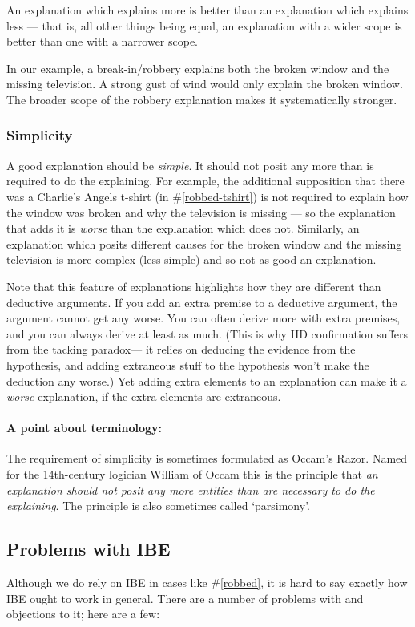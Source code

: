 \documentclass[]{article}
\newcommand*{\terminology}{\paragraph{A point about terminology:}}
\begin{document}
An explanation which explains more is better than an explanation which explains less --- that is, all other things being equal, an explanation with a wider scope is better than one with a narrower scope.

In our example, a break-in/robbery explains both the broken window and the missing television. A strong gust of wind would only explain the broken window. The broader scope of the robbery explanation makes it systematically stronger.

\subsubsection{Simplicity}

A good explanation should be \emph{simple}. It should not posit any more than is required to do the explaining. For example, the additional supposition that there was a Charlie's Angels t-shirt (in \#\ref{robbed-tshirt}) is not required to explain how the window was broken and why the television is missing --- so the explanation that adds it is \emph{worse} than the explanation which does not. Similarly, an explanation which posits different causes for the broken window and the missing television is more complex (less simple) and so not as good an explanation.

Note that this feature of explanations highlights how they are different than deductive arguments. If you add an extra premise to a deductive argument, the argument cannot get any worse. You can often derive more with extra premises, and you can always derive at least as much. (This is why HD confirmation suffers from the tacking paradox--- it relies on deducing the evidence from the hypothesis, and adding extraneous stuff to the hypothesis won't make the deduction any worse.) Yet adding extra elements to an explanation can make it a \emph{worse} explanation, if the extra elements are extraneous.

\terminology The requirement of simplicity is sometimes formulated as Occam's Razor. Named for the 14th-century logician William of Occam this is the principle that \emph{an explanation should not posit any more entities than are necessary to do the explaining}. The principle is also sometimes called `parsimony'.


\subsection{Problems with IBE}

Although we do rely on IBE in cases like \#\ref{robbed}, it is hard to say exactly how IBE ought to work in general. There are a number of problems with and objections to it; here are a few:
\end{document}
